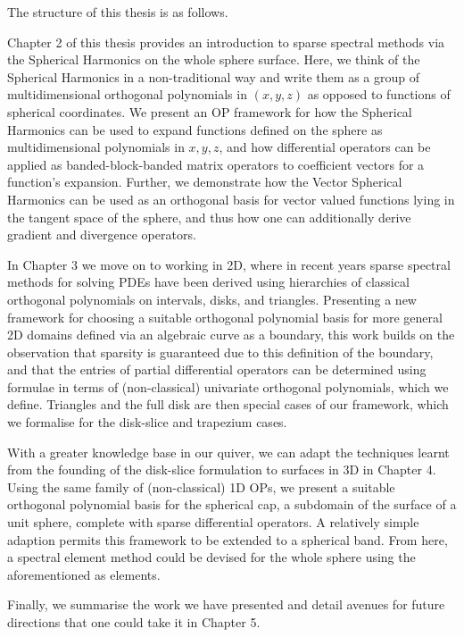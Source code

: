 The structure of this thesis is as follows.

Chapter 2 of this thesis provides an introduction to sparse spectral methods via the Spherical Harmonics on the whole sphere surface. Here, we think of the Spherical Harmonics in a non-traditional way and write them as a group of multidimensional orthogonal polynomials in $(x,y,z)$ as opposed to functions of spherical coordinates. We present an OP framework for how the Spherical Harmonics can be used to expand functions defined on the sphere as multidimensional polynomials in $x, y, z$, and how differential operators can be applied as banded-block-banded matrix operators to coefficient vectors for a function's expansion. Further, we demonstrate how the Vector Spherical Harmonics can be used as an orthogonal basis for vector valued functions lying in the tangent space of the sphere, and thus how one can additionally derive gradient and divergence operators.

In Chapter 3 we move on to working in 2D, where in recent years sparse spectral methods for solving PDEs have been derived using hierarchies of classical orthogonal polynomials on intervals, disks, and triangles. Presenting a new framework for choosing a suitable orthogonal polynomial basis for more general 2D domains defined via an algebraic curve as a boundary, this work builds on the observation that sparsity is guaranteed due to this definition of the boundary, and that the entries of partial differential operators can be determined using formulae in terms of (non-classical) univariate orthogonal polynomials, which we define. Triangles and the full disk are then special cases of our framework, which we formalise for the disk-slice and trapezium cases.

With a greater knowledge base in our quiver, we can adapt the techniques learnt from the founding of the disk-slice formulation to surfaces in 3D in Chapter 4. Using the same family of (non-classical) 1D OPs, we present a suitable orthogonal polynomial basis for the spherical cap, a subdomain of the surface of a unit sphere, complete with sparse differential operators. A relatively simple adaption permits this framework to be extended to a spherical band. From here, a spectral element method could be devised for the whole sphere using the aforementioned as elements.

Finally, we summarise the work we have presented and detail avenues for future directions that one could take it in Chapter 5.
